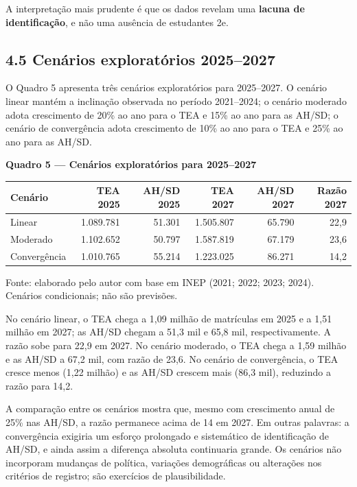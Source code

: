 A interpretação mais prudente é que os dados revelam uma \textbf{lacuna
de identificação}, e não uma ausência de estudantes 2e.

\subsection{4.5 Cenários exploratórios
2025--2027}\label{cenuxe1rios-exploratuxf3rios-20252027}

O Quadro 5 apresenta três cenários exploratórios para 2025--2027. O
cenário linear mantém a inclinação observada no período 2021--2024; o
cenário moderado adota crescimento de 20\% ao ano para o TEA e 15\% ao
ano para as AH/SD; o cenário de convergência adota crescimento de 10\%
ao ano para o TEA e 25\% ao ano para as AH/SD.

\textbf{Quadro 5 --- Cenários exploratórios para 2025--2027}

\begingroup\small

\begin{longtable}[]{@{}lrrrrr@{}}
\toprule\noalign{}
Cenário & TEA 2025 & AH/SD 2025 & TEA 2027 & AH/SD 2027 & Razão 2027 \\
\midrule\noalign{}
\endhead
\bottomrule\noalign{}
\endlastfoot
Linear & 1.089.781 & 51.301 & 1.505.807 & 65.790 & 22,9 \\
Moderado & 1.102.652 & 50.797 & 1.587.819 & 67.179 & 23,6 \\
Convergência & 1.010.765 & 55.214 & 1.223.025 & 86.271 & 14,2 \\
\end{longtable}

\endgroup

Fonte: elaborado pelo autor com base em INEP (2021; 2022; 2023; 2024).
Cenários condicionais; não são previsões.

No cenário linear, o TEA chega a 1,09 milhão de matrículas em 2025 e a
1,51 milhão em 2027; as AH/SD chegam a 51,3 mil e 65,8 mil,
respectivamente. A razão sobe para 22,9 em 2027. No cenário moderado, o
TEA chega a 1,59 milhão e as AH/SD a 67,2 mil, com razão de 23,6. No
cenário de convergência, o TEA cresce menos (1,22 milhão) e as AH/SD
crescem mais (86,3 mil), reduzindo a razão para 14,2.

A comparação entre os cenários mostra que, mesmo com crescimento anual
de 25\% nas AH/SD, a razão permanece acima de 14 em 2027. Em outras
palavras: a convergência exigiria um esforço prolongado e sistemático de
identificação de AH/SD, e ainda assim a diferença absoluta continuaria
grande. Os cenários não incorporam mudanças de política, variações
demográficas ou alterações nos critérios de registro; são exercícios de
plausibilidade.


